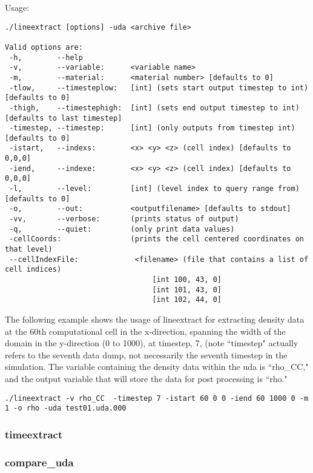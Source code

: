 Usage: \begin{Verbatim}[fontsize=\footnotesize]
./lineextract [options] -uda <archive file>

Valid options are:
 -h,        --help
 -v,        --variable:      <variable name>
 -m,        --material:      <material number> [defaults to 0]
 -tlow,     --timesteplow:   [int] (sets start output timestep to int) [defaults to 0]
 -thigh,    --timestephigh:  [int] (sets end output timestep to int) [defaults to last timestep]
 -timestep, --timestep:      [int] (only outputs from timestep int) [defaults to 0]
 -istart,   --indexs:        <x> <y> <z> (cell index) [defaults to 0,0,0]
 -iend,     --indexe:        <x> <y> <z> (cell index) [defaults to 0,0,0]
 -l,        --level:         [int] (level index to query range from) [defaults to 0]
 -o,        --out:           <outputfilename> [defaults to stdout]
 -vv,       --verbose:       (prints status of output)
 -q,        --quiet:         (only print data values)
 -cellCoords:                (prints the cell centered coordinates on that level)
 --cellIndexFile:             <filename> (file that contains a list of cell indices)
                                  [int 100, 43, 0]
                                  [int 101, 43, 0]
                                  [int 102, 44, 0]
\end{Verbatim}

The following example shows the usage of lineextract for extracting density data at the 60th computational cell in the x-direction, spanning the width of the domain in the y-direction (0 to 1000), at timestep, 7, (note ``timestep" actually 
refers to the seventh data dump, not necessarily the seventh timestep in the 
simulation. The variable containing the density data within the uda is ``rho\_CC," and the output variable that will store the data for post processing is ``rho."
\begin{Verbatim}[fontsize=\footnotesize]
./lineextract -v rho_CC  -timestep 7 -istart 60 0 0 -iend 60 1000 0 -m 1 -o rho -uda test01.uda.000
\end{Verbatim}

\subsubsection{timeextract}

\subsubsection{compare\_uda}

